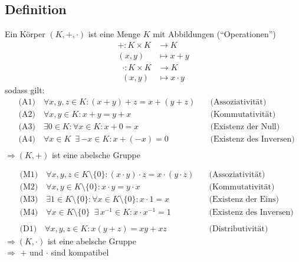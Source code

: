 \subsection{Definition}
Ein Körper \( (K,+,\cdot ) \) ist eine Menge \(K\) mit Abbildungen (\enquote{Operationen})
\begin{align*}
+ : K \times K &\longrightarrow K \\
(x,y) &\longmapsto x+y
\end{align*}
\begin{align*}
\cdot : K \times K &\longrightarrow K \\
(x,y)  &\longmapsto x \cdot y
\end{align*}
sodass gilt:
\begin{align*}
&\text{(A1)} \quad  \forall x,y,z \in K : (x+y)+z = x+(y+z) \quad &\text{(Assoziativität)} \\
&\text{(A2)} \quad \forall x,y \in K : x+y = y+x \quad &\text{(Kommutativität)} \\
&\text{(A3)} \quad  \exists 0 \in K : \forall x \in K : x+0=x \quad &\text{(Existenz der Null)} \\
&\text{(A4)} \quad  \forall x \in K \enspace \exists \, {-x} \in K : x + (-x) = 0 \quad &\text{(Existenz des Inversen)} \\
\end{align*}
\(\Longrightarrow (K,+)\) ist eine abelsche Gruppe

\begin{align*}
&\text{(M1)} \quad  \forall x,y,z \in K \setminus \{0\} : (x\cdot y) \cdot z = x\cdot (y\cdot z) \quad &\text{(Assoziativität)} \\
&\text{(M2)} \quad \forall x,y \in K \setminus \{0\} : x\cdot y = y\cdot x \quad &\text{(Kommutativität)} \\
&\text{(M3)} \quad  \exists 1 \in K \setminus \{0\} : \forall x \in K \setminus \{0\} : x\cdot 1=x \quad &\text{(Existenz der Eins)} \\
&\text{(M4)} \quad  \forall x \in K \setminus \{0\} \enspace \exists \, x^{-1} \in K : x \cdot x^{-1} = 1 \quad &\text{(Existenz des Inversen)} \\
&{} &{} \\
&\text{(D1)} \quad  \forall x,y,z \in K  : x(y+z) = xy +xz \quad &\text{(Distributivität)} 
\end{align*}
\(\Longrightarrow (K,\cdot )\) ist eine abelsche Gruppe \\
\(\Longrightarrow\) \(+\) und \(\cdot\) sind kompatibel


